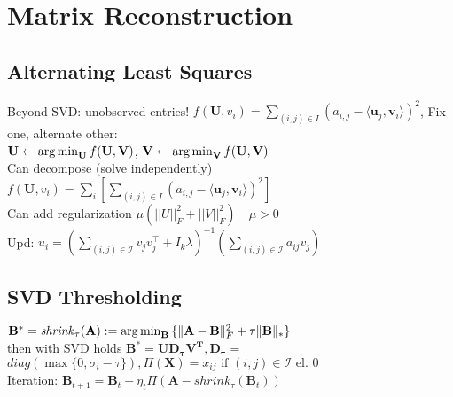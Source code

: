 \section*{Matrix Reconstruction}
\subsection*{Alternating Least Squares}
Beyond SVD: unobserved entries!
$f(\mathbf{U},v_i)=\sum_{(i,j)\in I} (a_{i,j} - \langle \mathbf{u}_j, \mathbf{v}_i \rangle)^2$,
Fix one, alternate other: \\
$\mathbf{U} \gets \operatorname*{arg\,min}_\mathbf{U} f(\mathbf{U},\mathbf{V})$, $\mathbf{V} \gets \operatorname*{arg\,min}_\mathbf{V} f(\mathbf{U},\mathbf{V})$ \\
Can decompose (solve independently) \\
$f(\mathbf{U},v_i)=\sum_i \left[ \sum_{(i,j)\in I} (a_{i,j} - \langle \mathbf{u}_j, \mathbf{v}_i \rangle)^2 \right]$ \\
Can add regularization $\mu (||U||_F^2 + ||V||_F^2 )\quad \mu >0$ \\
Upd: $u_i = \left( \sum_{(i,j)\in \mathcal{I}} v_jv_j^\top + I_k\lambda\right)^{-1} \left(\sum_{(i,j)\in \mathcal{I}} a_{ij}v_j \right)$

\subsection*{SVD Thresholding}
$\mathbf{B}^{*}=\mathit{shrink}_\tau(\mathbf{A}):=\operatorname*{arg\,min}_{\mathbf{B}}{\{\|\mathbf{A-B}\|^2_F + \tau\|\mathbf{B}\|_{*}\}}$\\
then with SVD holds $\mathbf{B^*=UD_\tau V^T, D_\tau} =$ \\
$\mathit{diag}(\max\{0,\sigma_i - \tau\}),\Pi(\mathbf{X}) = x_{ij} \text{ if } (i,j) \in \mathcal{I} \text{ el. } 0$ \\
Iteration: $\mathbf{B}_{t+1}=\mathbf{B}_t + \eta_t \Pi(\mathbf{A} - \mathit{shrink}_\tau(\mathbf{B}_t))$
